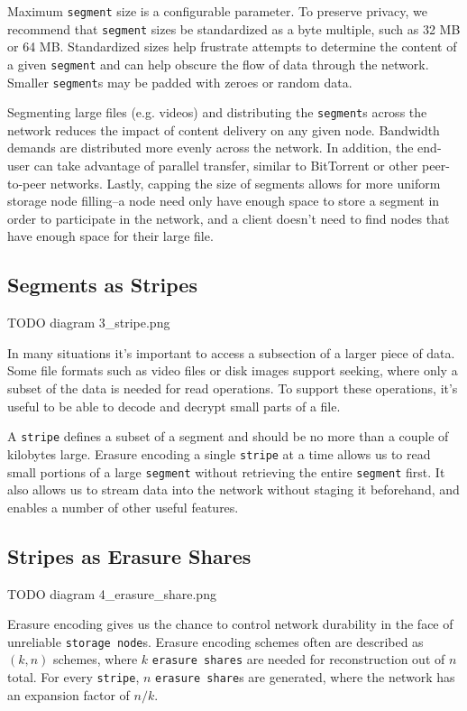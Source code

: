 \documentclass[11pt,fleqn,openany]{book}
\newcommand{\x}[1]{{\tt #1}} \newcommand{\code}[1]{{\em #1}}
\newcommand{\todo}[1]{{\color{red} TODO #1 }}
\begin{document}
Maximum \x{segment} size is a configurable parameter. To preserve privacy, we
recommend that \x{segment} sizes be standardized as a byte multiple, such as
32 MB or 64 MB.
Standardized sizes help frustrate attempts to determine the content of a given
\x{segment} and can help obscure the flow of data through the network.
Smaller \x{segment}s may be padded with zeroes or random data.

Segmenting large files (e.g. videos) and distributing the \x{segment}s
across the network reduces the impact of content delivery on any
given node.
Bandwidth demands are distributed more evenly across the network.
In addition, the end-user can take advantage of parallel transfer, similar to
BitTorrent or other peer-to-peer networks. Lastly, capping the size of segments
allows for more uniform storage node filling--a node need only have enough
space to store a segment in order to participate in the network,
and a client doesn't need
to find nodes that have enough space for their large file.

\subsection{Segments as Stripes}

\todo{diagram 3\_stripe.png}

In many situations it's important to access a subsection of a larger piece of
data. Some file formats such as video files or disk images support seeking,
where only a subset of the data is needed for read operations.
To support these operations,
it's useful to be able to decode and decrypt small parts of a file.

A \x{stripe} defines a subset of a segment and should be no more than a
couple of kilobytes large. Erasure encoding
a single \x{stripe} at a time allows us to read small portions of a
large \x{segment} without retrieving the entire \x{segment} first.
It also allows us to stream data into the
network without staging it beforehand, and enables a number of other useful
features.

\subsection{Stripes as Erasure Shares}

\todo{diagram 4\_erasure\_share.png}

Erasure encoding gives us the chance to control network durability in the face
of unreliable \x{storage node}s. Erasure encoding schemes often are
described as $(k, n)$ schemes, where $k$ \x{erasure shares} are needed for
reconstruction out of $n$ total. For every \x{stripe}, $n$ \x{erasure share}s
are generated, where the network has an expansion factor of $n/k$.
\end{document}
